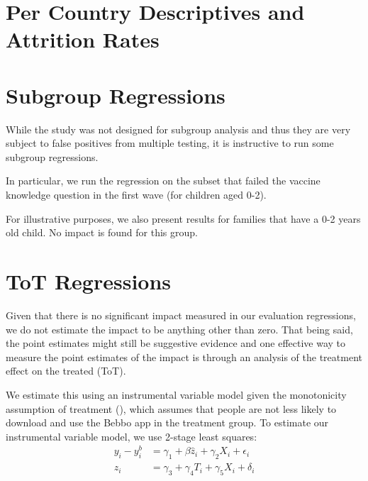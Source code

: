 \section{Per Country Descriptives and Attrition Rates}








\section{Subgroup Regressions}

While the study was not designed for subgroup analysis and thus they are very subject to false positives from multiple testing, it is instructive to run some subgroup regressions.

In particular, we run the regression on the subset that failed the vaccine knowledge question in the first wave (for children aged 0-2).



For illustrative purposes, we also present results for families that have a 0-2 years old child. No impact is found for this group.





\section{ToT Regressions}

Given that there is no significant impact measured in our evaluation regressions, we do not estimate the impact to be anything other than zero. That being said, the point estimates might still be suggestive evidence and one effective way to measure the point estimates of the impact is through an analysis of the treatment effect on the treated (ToT).

We estimate this using an instrumental variable model given the monotonicity assumption of treatment (\cite{Imbens2015}), which assumes that people are not less likely to download and use the Bebbo app in the treatment group. To estimate our instrumental variable model, we use 2-stage least squares:
\begin{align*}
y_{i} - y^{b}_i &= \gamma_1 + \beta \hat{z}_{i} + \gamma_2X_{i} + \epsilon_i \\
z_{i} &= \gamma_3 + \gamma_4 T_{i} + \gamma_5X_{i} + \delta_i
\end{align*}

